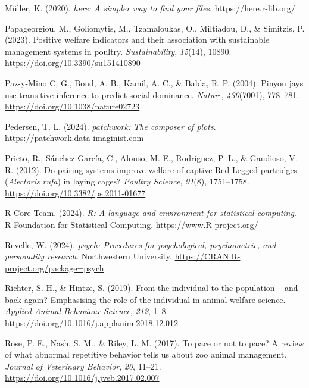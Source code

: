\documentclass[
  pub]{apa6}
\newlength{\cslhangindent}
\newenvironment{CSLReferences}[2] %
 {\begin{list}{}{%
  \setlength{\itemindent}{0pt}
  \setlength{\leftmargin}{0pt}
  \setlength{\parsep}{0pt}
  \ifodd #1
   \setlength{\leftmargin}{\cslhangindent}
   \setlength{\itemindent}{-1\cslhangindent}
  \fi
  \setlength{\itemsep}{#2\baselineskip}}}
 {\end{list}}
\begin{document}
\begin{CSLReferences}{1}{0}
Müller, K. (2020). \emph{{here}: A simpler way to find your files}. \url{https://here.r-lib.org/}

Papageorgiou, M., Goliomytis, M., Tzamaloukas, O., Miltiadou, D., \& Simitzis, P. (2023). Positive welfare indicators and their association with sustainable management systems in poultry. \emph{Sustainability}, \emph{15}(14), 10890. \url{https://doi.org/10.3390/su151410890}

Paz-y-Mino C, G., Bond, A. B., Kamil, A. C., \& Balda, R. P. (2004). Pinyon jays use transitive inference to predict social dominance. \emph{Nature}, \emph{430}(7001), 778--781. \url{https://doi.org/10.1038/nature02723}

Pedersen, T. L. (2024). \emph{{patchwork}: The composer of plots}. \url{https://patchwork.data-imaginist.com}

Prieto, R., Sánchez-García, C., Alonso, M. E., Rodríguez, P. L., \& Gaudioso, V. R. (2012). Do pairing systems improve welfare of captive {Red-Legged} partridges ({\emph{Alectoris}}{ \emph{rufa}}) in laying cages? \emph{Poultry Science}, \emph{91}(8), 1751--1758. \url{https://doi.org/10.3382/ps.2011-01677}

R Core Team. (2024). \emph{R: A language and environment for statistical computing}. R Foundation for Statistical Computing. \url{https://www.R-project.org/}

Revelle, W. (2024). \emph{{psych}: Procedures for psychological, psychometric, and personality research}. Northwestern University. \url{https://CRAN.R-project.org/package=psych}

Richter, S. H., \& Hintze, S. (2019). From the individual to the population -- and back again? {Emphasising} the role of the individual in animal welfare science. \emph{Applied Animal Behaviour Science}, \emph{212}, 1--8. \url{https://doi.org/10.1016/j.applanim.2018.12.012}

Rose, P. E., Nash, S. M., \& Riley, L. M. (2017). To pace or not to pace? {A} review of what abnormal repetitive behavior tells us about zoo animal management. \emph{Journal of Veterinary Behavior}, \emph{20}, 11--21. \url{https://doi.org/10.1016/j.jveb.2017.02.007}


\end{CSLReferences}
\end{document}
